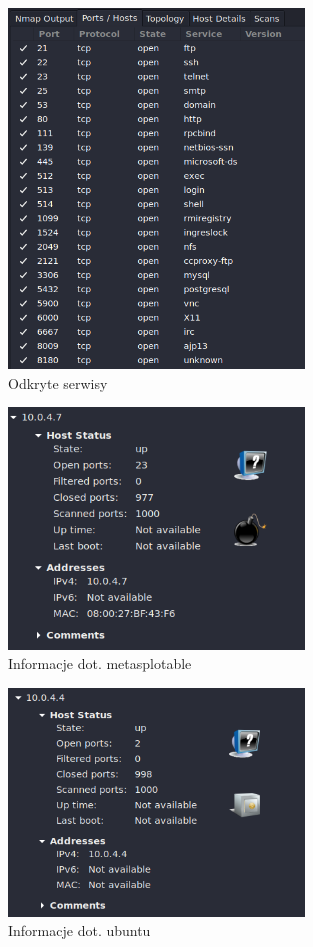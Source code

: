 \documentclass{article}
\begin{document}
\begin{figure}[H]
  \centering
  \includegraphics[width=0.7\textwidth]{zenmap_services.png}
  \caption{Odkryte serwisy}
\end{figure}

\begin{figure}[H]
  \centering
  \includegraphics[width=0.7\textwidth]{zenmap_meta.png}
  \caption{Informacje dot. metasplotable}
\end{figure}

\begin{figure}[H]
  \centering
  \includegraphics[width=0.7\textwidth]{zenmap_ubuntu.png}
  \caption{Informacje dot. ubuntu}
\end{figure}
\end{document}
